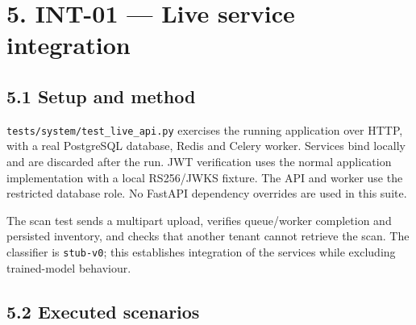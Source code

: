 \documentclass[
  11pt,
]{article}
\begin{document}
\section{5. INT-01 --- Live service
integration}\label{int-01-live-service-integration}

\subsection{5.1 Setup and method}\label{setup-and-method}

\texttt{tests/system/test\_live\_api.py} exercises the running
application over HTTP, with a real PostgreSQL database, Redis and Celery
worker. Services bind locally and are discarded after the run. JWT
verification uses the normal application implementation with a local
RS256/JWKS fixture. The API and worker use the restricted database role.
No FastAPI dependency overrides are used in this suite.

The scan test sends a multipart upload, verifies queue/worker completion
and persisted inventory, and checks that another tenant cannot retrieve
the scan. The classifier is \texttt{stub-v0}; this establishes
integration of the services while excluding trained-model behaviour.

\subsection{5.2 Executed scenarios}\label{executed-scenarios}
\end{document}
